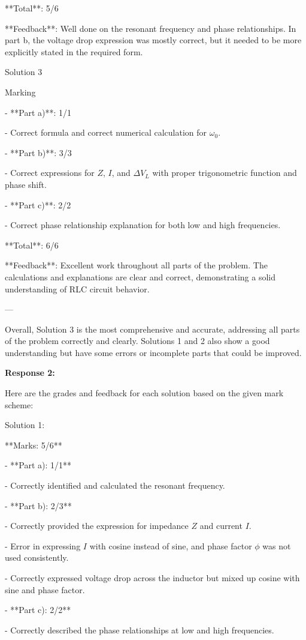 \documentclass[a4paper,11pt]{article}
\begin{document}
**Total**: 5/6

**Feedback**: Well done on the resonant frequency and phase relationships. In part b, the voltage drop expression was mostly correct, but it needed to be more explicitly stated in the required form.

Solution 3

Marking

- **Part a)**: 1/1

  - Correct formula and correct numerical calculation for \(\omega_0\).
  
- **Part b)**: 3/3

  - Correct expressions for \(Z\), \(I\), and \(\Delta V_L\) with proper trigonometric function and phase shift.
  
- **Part c)**: 2/2

  - Correct phase relationship explanation for both low and high frequencies.

**Total**: 6/6

**Feedback**: Excellent work throughout all parts of the problem. The calculations and explanations are clear and correct, demonstrating a solid understanding of RLC circuit behavior.

---

Overall, Solution 3 is the most comprehensive and accurate, addressing all parts of the problem correctly and clearly. Solutions 1 and 2 also show a good understanding but have some errors or incomplete parts that could be improved.

\bigskip
\textbf{Response 2:}

Here are the grades and feedback for each solution based on the given mark scheme:

Solution 1:

**Marks: 5/6**

- **Part a): 1/1**

  - Correctly identified and calculated the resonant frequency.
  
- **Part b): 2/3**

  - Correctly provided the expression for impedance \( Z \) and current \( I \).
  
  - Error in expressing \( I \) with cosine instead of sine, and phase factor \(\phi\) was not used consistently.
  
  - Correctly expressed voltage drop across the inductor but mixed up cosine with sine and phase factor.
  
- **Part c): 2/2**

  - Correctly described the phase relationships at low and high frequencies.
\end{document}
